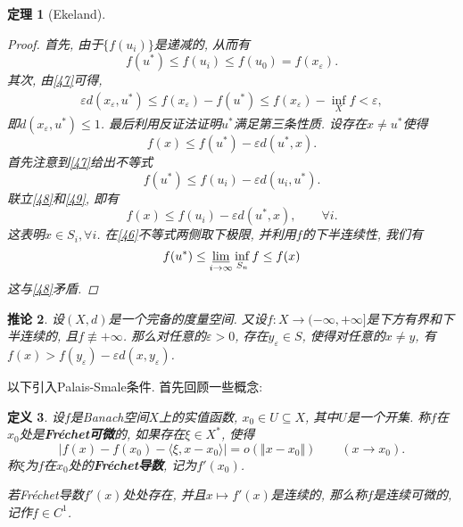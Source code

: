 \documentclass[12pt,a4paper]{article}
\newtheorem{theorem}{定理}[section]
\newtheorem{definition}[theorem]{定义}
\newtheorem{corollary}[theorem]{推论}
\begin{document}
\begin{theorem}[Ekeland]
\begin{proof}
        首先, 由于$\{f(u_i)\}$是递减的, 从而有 
        \begin{equation*}
            f(u^*) \leq f(u_i) \leq f(u_0) = f(x_{\varepsilon}).
        \end{equation*}
        其次, 由\eqref{47}可得, 
        \begin{align*}
            \varepsilon d(x_{\varepsilon}, u^*) \leq f(x_{\varepsilon}) - f(u^*) \leq f(x_{\varepsilon}) - \inf_Xf < \varepsilon,
        \end{align*}
        即$d(x_{\varepsilon}, u^*) \leq 1$. 最后利用反证法证明$u^*$满足第三条性质. 设存在$x \neq u^*$使得 
        \begin{equation}\label{48}
            f(x) \leq f(u^*) - \varepsilon d(u^*, x).
        \end{equation} 
        首先注意到\eqref{47}给出不等式 
        \begin{equation}\label{49}
            f(u^*) \leq f(u_i) - \varepsilon d(u_i, u^*).
        \end{equation}
        联立\eqref{48}和\eqref{49}, 即有 
        \begin{equation*}
            f(x) \leq f(u_i) - \varepsilon d(u^*, x), \qquad \forall i.
        \end{equation*}
        这表明$x \in S_i, \forall i$. 在\eqref{46}不等式两侧取下极限, 并利用$f$的下半连续性, 我们有 
        \begin{equation*}
            f(u^*) \leq \varliminf\limits_{i \rightarrow \infty}\inf_{S_n}f \leq f(x)
        \end{equation*}
        这与\eqref{48}矛盾.
    \end{proof}
\end{theorem}

\begin{corollary}
    设$(X, d)$是一个完备的度量空间. 又设$f\colon X \rightarrow (-\infty, +\infty]$是下方有界和下半连续的, 且$f \not\equiv +\infty$.
    那么对任意的$\varepsilon > 0$, 存在$y_{\varepsilon} \in S$, 使得对任意的$x \neq y$, 有$f(x) > f(y_{\varepsilon}) - \varepsilon d(x, y_{\varepsilon})$.
\end{corollary}

以下引入Palais-Smale条件. 首先回顾一些概念:

\begin{definition}
    设$f$是Banach空间$X$上的实值函数, $x_0 \in U \subseteq X$, 其中$U$是一个开集.
    称$f$在$x_0$处是\textbf{Fr\'echet可微}的, 如果存在$\xi \in X^*$, 使得 
    \begin{equation*}
        |f(x) - f(x_0) - \langle \xi, x - x_0\rangle| = o(\Vert x - x_0\Vert) \qquad (x \rightarrow x_0).
    \end{equation*}
    称$\xi$为$f$在$x_0$处的\textbf{Fr\'echet导数}, 记为$f'(x_0)$.

    若Fr\'echet导数$f'(x)$处处存在, 并且$x \mapsto f'(x)$是连续的, 那么称$f$是连续可微的, 记作$f \in C^1$.
\end{definition}
\end{document}
